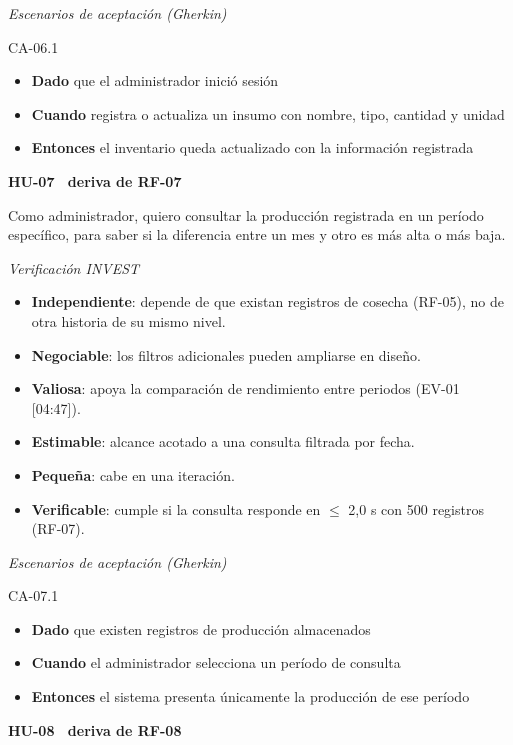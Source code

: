 \documentclass[12pt,a4paper]{article}
\begin{document}
\smallskip
\noindent\textit{Escenarios de aceptación (Gherkin)}

\noindent CA-06.1
\begin{itemize}
\item[] \textbf{Dado} que el administrador inició sesión
\item[] \textbf{Cuando} registra o actualiza un insumo con nombre, tipo, cantidad y unidad
\item[] \textbf{Entonces} el inventario queda actualizado con la información registrada
\end{itemize}

\bigskip
\noindent\textbf{HU-07 \textperiodcentered\ deriva de RF-07}

\smallskip
\noindent Como administrador, quiero consultar la producción registrada en un período específico, para saber si la diferencia entre un mes y otro es más alta o más baja.

\smallskip
\noindent\textit{Verificación INVEST}
\begin{itemize}
\item \textbf{Independiente}: depende de que existan registros de cosecha (RF-05), no de otra historia de su mismo nivel.
\item \textbf{Negociable}: los filtros adicionales pueden ampliarse en diseño.
\item \textbf{Valiosa}: apoya la comparación de rendimiento entre periodos (EV-01 [04:47]).
\item \textbf{Estimable}: alcance acotado a una consulta filtrada por fecha.
\item \textbf{Pequeña}: cabe en una iteración.
\item \textbf{Verificable}: cumple si la consulta responde en $\leq$ 2,0 s con 500 registros (RF-07).
\end{itemize}

\smallskip
\noindent\textit{Escenarios de aceptación (Gherkin)}

\noindent CA-07.1
\begin{itemize}
\item[] \textbf{Dado} que existen registros de producción almacenados
\item[] \textbf{Cuando} el administrador selecciona un período de consulta
\item[] \textbf{Entonces} el sistema presenta únicamente la producción de ese período
\end{itemize}

\bigskip
\noindent\textbf{HU-08 \textperiodcentered\ deriva de RF-08}
\end{document}
